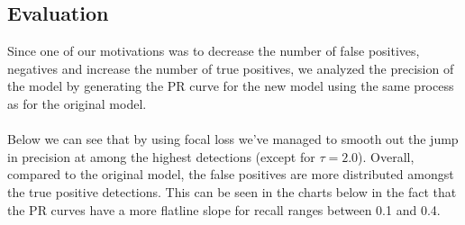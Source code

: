 \documentclass[letter]{article}
\begin{document}
	\subsection{Evaluation}
	Since one of our motivations was to decrease the number of false positives, negatives and increase the number of true positives, we analyzed the precision of the model by generating the PR curve for the new model using the same process as for the original model.\\\\
	Below we can see that by using focal loss we've managed to smooth out the jump in precision at among the highest detections (except for $\tau=2.0$). Overall, compared to the original model, the false positives are more distributed amongst the true positive detections. This can be seen in the charts below in the fact that the PR curves have a more flatline slope for recall ranges between 0.1 and 0.4.
\end{document}

